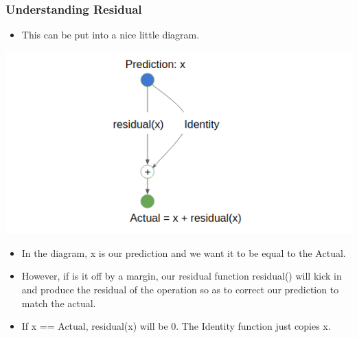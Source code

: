 \documentclass{beamer}
\begin{document}

\begin{frame}
\frametitle{Understanding Residual}

\begin{itemize}
   
   \item This can be put into a nice little diagram.
  
  
\end{itemize}
\centering
\includegraphics[scale=0.5]{resnet.PNG}

\begin{itemize}
    \item In the diagram, x is our prediction and we want it to be equal to the Actual. 
    \item However, if is it off by a margin, our residual function residual() will kick in and produce the residual of the operation so as to correct our prediction to match the actual.
    \item If x == Actual, residual(x) will be 0. The Identity function just copies x.
\end{itemize}
\end{frame}

\end{document}
